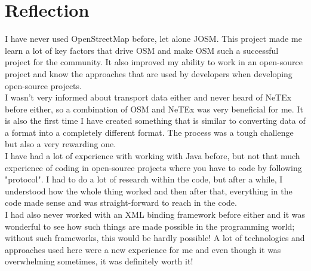 \section{Reflection}
I have never used OpenStreetMap before, let alone JOSM. This project made me learn a lot of key factors that drive OSM and make OSM such a successful project for the community. It also improved my ability to work in an open-source project and know the approaches that are used by developers when developing open-source projects.\\
\newline
I wasn't very informed about transport data either and never heard of NeTEx before either, so a combination of OSM and NeTEx was very beneficial for me. It is also the first time I have created something that is similar to converting data of a format into a completely different format. The process was a tough challenge but also a very rewarding one.\\
\newline
I have had a lot of experience with working with Java before, but not that much experience of coding in open-source projects where you have to code by following "protocol". I had to do a lot of research within the code, but after a while, I understood how the whole thing worked and then after that, everything in the code made sense and was straight-forward to reach in the code.\\
\newline
I had also never worked with an XML binding framework before either and it was wonderful to see how such things are made possible in the programming world; without such frameworks, this would be hardly possible! A lot of technologies and approaches used here were a new experience for me and even though it was overwhelming sometimes, it was definitely worth it!